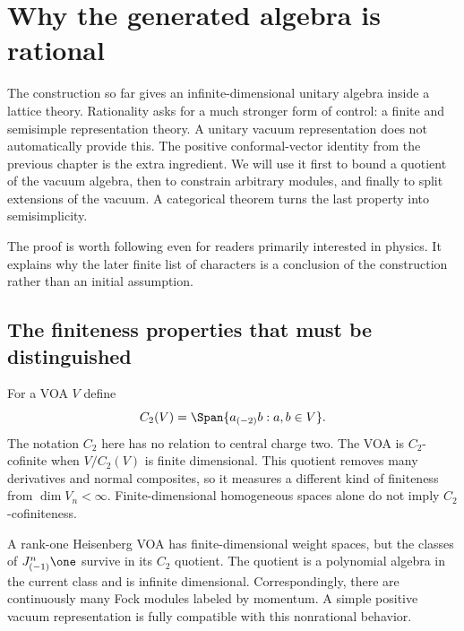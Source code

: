 \chapter{Why the generated algebra is rational}
\label{ch:regularity}

The construction so far gives an infinite-dimensional unitary algebra
inside a lattice theory. Rationality asks for a much stronger form of
control: a finite and semisimple representation theory. A unitary
vacuum representation does not automatically provide this. The
positive conformal-vector identity from the previous chapter is the
extra ingredient. We will use it first to bound a quotient of the
vacuum algebra, then to constrain arbitrary modules, and finally to
split extensions of the vacuum. A categorical theorem turns the last
property into semisimplicity.

The proof is worth following even for readers primarily interested in
physics. It explains why the later finite list of characters is a
conclusion of the construction rather than an initial assumption.

\section{The finiteness properties that must be distinguished}

For a VOA $V$ define
\[
 C_2(V)=\Span\{a_{(-2)}b:a,b\in V\}.
\]
The notation $C_2$ here has no relation to central charge two. The VOA
is $C_2$-cofinite when $V/C_2(V)$ is finite dimensional.
This quotient removes many derivatives and normal composites, so it
measures a different kind of finiteness from $\dim V_n<\infty$.
Finite-dimensional homogeneous spaces alone do not imply
$C_2$-cofiniteness.

\begin{example}
A rank-one Heisenberg VOA has finite-dimensional weight spaces, but
the classes of $J_{(-1)}^n\one$ survive in its $C_2$ quotient. The
quotient is a polynomial algebra in the current class and is infinite
dimensional. Correspondingly, there are continuously many Fock modules
labeled by momentum. A simple positive vacuum representation is fully
compatible with this nonrational behavior.
\end{example}

